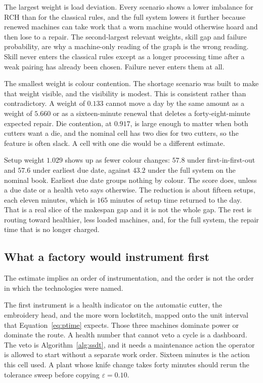 The largest weight is load deviation. Every scenario shows a lower imbalance for RCH than for the classical rules, and the full system lowers it further because renewed machines can take work that a worn machine would otherwise hoard and then lose to a repair. The second-largest relevant weights, skill gap and failure probability, are why a machine-only reading of the graph is the wrong reading. Skill never enters the classical rules except as a longer processing time after a weak pairing has already been chosen. Failure never enters them at all.

The smallest weight is colour contention. The shortage scenario was built to make that weight visible, and the visibility is modest. This is consistent rather than contradictory. A weight of \(0.133\) cannot move a day by the same amount as a weight of \(5.660\) or as a sixteen-minute renewal that deletes a forty-eight-minute expected repair. Die contention, at \(0.917\), is large enough to matter when both cutters want a die, and the nominal cell has two dies for two cutters, so the feature is often slack. A cell with one die would be a different estimate.

Setup weight \(1.029\) shows up as fewer colour changes: \(57.8\) under first-in-first-out and \(57.6\) under earliest due date, against \(43.2\) under the full system on the nominal book. Earliest due date groups nothing by colour. The score does, unless a due date or a health veto says otherwise. The reduction is about fifteen setups, each eleven minutes, which is \(165\) minutes of setup time returned to the day. That is a real slice of the makespan gap and it is not the whole gap. The rest is routing toward healthier, less loaded machines, and, for the full system, the repair time that is no longer charged.

\subsection{What a factory would instrument first}

The estimate implies an order of instrumentation, and the order is not the order in which the technologies were named.

The first instrument is a health indicator on the automatic cutter, the embroidery head, and the more worn lockstitch, mapped onto the unit interval that Equation~\eqref{eq:ptime} expects. Those three machines dominate power or dominate the route. A health number that cannot veto a cycle is a dashboard. The veto is Algorithm~\ref{alg:ssdt}, and it needs a maintenance action the operator is allowed to start without a separate work order. Sixteen minutes is the action this cell used. A plant whose knife change takes forty minutes should rerun the tolerance sweep before copying \(\varepsilon = 0.10\).

